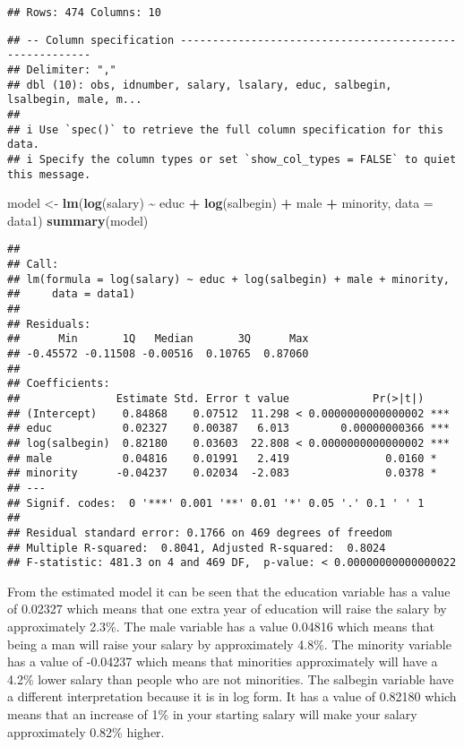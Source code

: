 \documentclass[
]{article}
\newenvironment{Shaded}{\begin{snugshade}}{\end{snugshade}}
\newcommand{\AttributeTok}[1]{\textcolor[rgb]{0.13,0.29,0.53}{#1}}
\newcommand{\FunctionTok}[1]{\textcolor[rgb]{0.13,0.29,0.53}{\textbf{#1}}}
\newcommand{\NormalTok}[1]{#1}
\newcommand{\OtherTok}[1]{\textcolor[rgb]{0.56,0.35,0.01}{#1}}
\newcommand{\SpecialCharTok}[1]{\textcolor[rgb]{0.81,0.36,0.00}{\textbf{#1}}}
\begin{document}
\begin{verbatim}
## Rows: 474 Columns: 10
\end{verbatim}

\begin{verbatim}
## -- Column specification --------------------------------------------------------
## Delimiter: ","
## dbl (10): obs, idnumber, salary, lsalary, educ, salbegin, lsalbegin, male, m...
## 
## i Use `spec()` to retrieve the full column specification for this data.
## i Specify the column types or set `show_col_types = FALSE` to quiet this message.
\end{verbatim}

\begin{Shaded}
\begin{Highlighting}[]
\NormalTok{model }\OtherTok{\textless{}{-}} \FunctionTok{lm}\NormalTok{(}\FunctionTok{log}\NormalTok{(salary) }\SpecialCharTok{\textasciitilde{}}\NormalTok{ educ }\SpecialCharTok{+} \FunctionTok{log}\NormalTok{(salbegin) }\SpecialCharTok{+}\NormalTok{ male }\SpecialCharTok{+}\NormalTok{ minority, }\AttributeTok{data =}\NormalTok{ data1)}
\FunctionTok{summary}\NormalTok{(model)}
\end{Highlighting}
\end{Shaded}

\begin{verbatim}
## 
## Call:
## lm(formula = log(salary) ~ educ + log(salbegin) + male + minority, 
##     data = data1)
## 
## Residuals:
##      Min       1Q   Median       3Q      Max 
## -0.45572 -0.11508 -0.00516  0.10765  0.87060 
## 
## Coefficients:
##               Estimate Std. Error t value             Pr(>|t|)    
## (Intercept)    0.84868    0.07512  11.298 < 0.0000000000000002 ***
## educ           0.02327    0.00387   6.013        0.00000000366 ***
## log(salbegin)  0.82180    0.03603  22.808 < 0.0000000000000002 ***
## male           0.04816    0.01991   2.419               0.0160 *  
## minority      -0.04237    0.02034  -2.083               0.0378 *  
## ---
## Signif. codes:  0 '***' 0.001 '**' 0.01 '*' 0.05 '.' 0.1 ' ' 1
## 
## Residual standard error: 0.1766 on 469 degrees of freedom
## Multiple R-squared:  0.8041, Adjusted R-squared:  0.8024 
## F-statistic: 481.3 on 4 and 469 DF,  p-value: < 0.00000000000000022
\end{verbatim}

From the estimated model it can be seen that the education variable has
a value of 0.02327 which means that one extra year of education will
raise the salary by approximately 2.3\%. The male variable has a value
0.04816 which means that being a man will raise your salary by
approximately 4.8\%. The minority variable has a value of -0.04237 which
means that minorities approximately will have a 4.2\% lower salary than
people who are not minorities. The salbegin variable have a different
interpretation because it is in log form. It has a value of 0.82180
which means that an increase of 1\% in your starting salary will make
your salary approximately 0.82\% higher.
\end{document}
